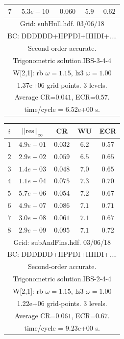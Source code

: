 \begin{table}[hbt]
\begin{center}
{\begin{tabular}{|c|c|c|c|c|}
 $ 7$  & $ 5.3e-10$ & $0.060$ & $ 5.9$ & $0.62$ \\ 
\hline 
\multicolumn{5}{|c|}{Grid: subHull.hdf. 03/06/18}  \\
\multicolumn{5}{|c|}{BC: DDDDDD+IIPPDI+IIIIDI+....}  \\
\multicolumn{5}{|c|}{Second-order accurate.}  \\
\multicolumn{5}{|c|}{Trigonometric solution.IBS-3-4-4}  \\
\multicolumn{5}{|c|}{W[2,1]: rb $\omega=1.15$, lz3 $\omega=1.00$}  \\
\multicolumn{5}{|c|}{1.37e+06 grid-points. 3 levels.}  \\
\multicolumn{5}{|c|}{Average CR=$0.041$, ECR=$0.57$.}  \\
\multicolumn{5}{|c|}{time/cycle = 6.52e+00 s.}  \\
\hline 
\end{tabular}
\begin{tabular}{|c|c|c|c|c|} \hline 
 $i$   & $\vert\vert\mbox{res}\vert\vert_\infty$  &  CR     &  WU    & ECR  \\   \hline 
 $ 1$  & $ 4.9e-01$ & $0.032$ & $ 6.2$ & $0.57$ \\ 
 $ 2$  & $ 2.9e-02$ & $0.059$ & $ 6.5$ & $0.65$ \\ 
 $ 3$  & $ 1.4e-03$ & $0.048$ & $ 7.0$ & $0.65$ \\ 
 $ 4$  & $ 1.1e-04$ & $0.075$ & $ 7.3$ & $0.70$ \\ 
 $ 5$  & $ 5.7e-06$ & $0.054$ & $ 7.2$ & $0.67$ \\ 
 $ 6$  & $ 4.9e-07$ & $0.086$ & $ 7.1$ & $0.71$ \\ 
 $ 7$  & $ 3.0e-08$ & $0.061$ & $ 7.1$ & $0.67$ \\ 
 $ 8$  & $ 2.9e-09$ & $0.095$ & $ 7.1$ & $0.72$ \\ 
\hline 
\multicolumn{5}{|c|}{Grid: subAndFins.hdf. 03/06/18}  \\
\multicolumn{5}{|c|}{BC: DDDDDD+IIPPDI+IIIIDI+....}  \\
\multicolumn{5}{|c|}{Second-order accurate.}  \\
\multicolumn{5}{|c|}{Trigonometric solution.IBS-2-4-4}  \\
\multicolumn{5}{|c|}{W[2,1]: rb $\omega=1.15$, lz3 $\omega=1.00$}  \\
\multicolumn{5}{|c|}{1.22e+06 grid-points. 3 levels.}  \\
\multicolumn{5}{|c|}{Average CR=$0.061$, ECR=$0.67$.}  \\
\multicolumn{5}{|c|}{time/cycle = 9.23e+00 s.}  \\

\end{tabular}}
\end{center}
\end{table}
